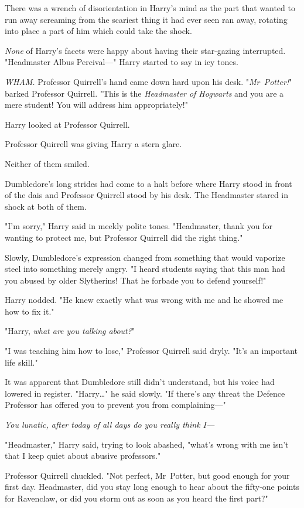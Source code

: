 There was a wrench of disorientation in Harry's mind as the part that wanted to
run away screaming from the scariest thing it had ever seen ran away, rotating
into place a part of him which could take the shock.

\emph{None} of Harry's facets were happy about having their star-gazing
interrupted. "Headmaster Albus Percival---" Harry started to say in icy tones.

\emph{WHAM.} Professor Quirrell's hand came down hard upon his desk.
"\emph{Mr~Potter!}" barked Professor Quirrell. "This is the \emph{Headmaster
of Hogwarts} and you are a mere student! You will address him appropriately!"

Harry looked at Professor Quirrell.

Professor Quirrell was giving Harry a stern glare.

Neither of them smiled.

Dumbledore's long strides had come to a halt before where Harry stood in front
of the dais and Professor Quirrell stood by his desk. The Headmaster stared in
shock at both of them.

"I'm sorry," Harry said in meekly polite tones. "Headmaster, thank you for
wanting to protect me, but Professor Quirrell did the right thing."

Slowly, Dumbledore's expression changed from something that would vaporize
steel into something merely angry. "I heard students saying that this man had
you abused by older Slytherins! That he forbade you to defend yourself!"

Harry nodded. "He knew exactly what was wrong with me and he showed me how to
fix it."

"Harry, \emph{what are you talking about?}"

"I was teaching him how to lose," Professor Quirrell said dryly. "It's an
important life skill."

It was apparent that Dumbledore still didn't understand, but his voice had
lowered in register. "Harry…" he said slowly. "If there's any threat the
Defence Professor has offered you to prevent you from complaining---"

\emph{You lunatic, after today of all days do you really think I---}

"Headmaster," Harry said, trying to look abashed, "what's wrong with me isn't
that I keep quiet about abusive professors."

Professor Quirrell chuckled. "Not perfect, Mr~Potter, but good enough for your
first day. Headmaster, did you stay long enough to hear about the fifty-one
points for Ravenclaw, or did you storm out as soon as you heard the first part?"

